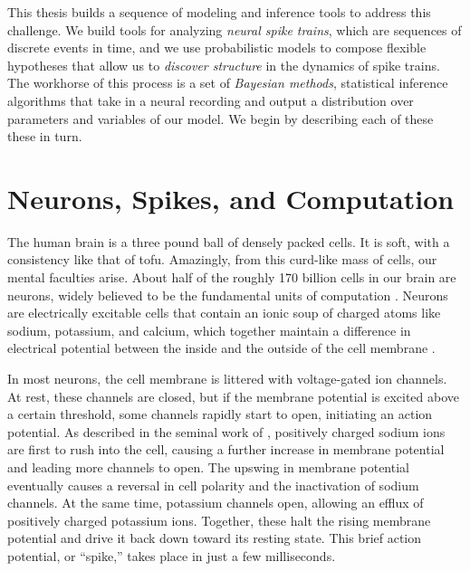 This thesis builds a sequence of modeling and inference tools to
address this challenge. We build tools for analyzing \emph{neural spike
  trains}, which are sequences of discrete events in time, and we use
probabilistic models to compose flexible hypotheses that allow us to
\emph{discover structure} in the dynamics of spike trains.  The
workhorse of this process is a set of \emph{Bayesian methods},
statistical inference algorithms that take in a neural recording and
output a distribution over parameters and variables of our model.  We
begin by describing each of these these in turn.


\section{Neurons, Spikes, and Computation}
The human brain is a three pound ball of densely packed cells.  It is
soft, with a consistency like that of tofu.  Amazingly, from this
curd-like mass of cells, our mental faculties arise.  About half of
the roughly 170 billion cells in our brain are neurons, widely
believed to be the fundamental units of computation
\citep{DayanAbbott}.  Neurons are electrically excitable cells that
contain an ionic soup of charged atoms like sodium, potassium, and
calcium, which together maintain a difference in electrical potential
between the inside and the outside of the cell membrane
\citep{kandel2000principles}.

In most neurons, the cell membrane is littered with voltage-gated ion
channels. At rest, these channels are closed, but if the membrane
potential is excited above a certain threshold, some channels
rapidly start to open, initiating an action potential.
As described in the seminal work of \cite{hodgkin1952quantitative},
positively charged sodium ions are first to rush into the cell,
causing a further increase in membrane potential and leading more
channels to open.
The upswing in membrane potential
eventually causes a reversal in cell polarity and the inactivation of
sodium channels. At the same time, potassium channels open, allowing
an efflux of positively charged potassium ions. Together, these halt the rising membrane
potential and drive it back down toward its resting state.
This brief action potential, or ``spike,'' takes place in
just a few milliseconds.

